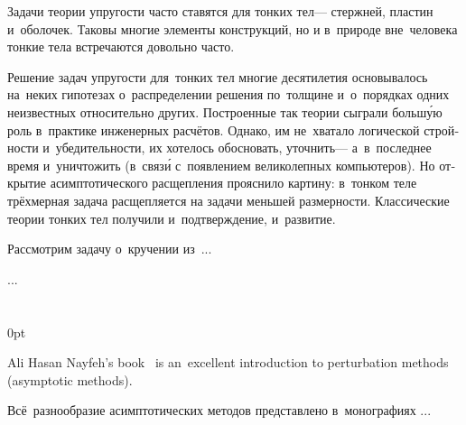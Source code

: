 \begin{otherlanguage}{russian}

Задачи теории упругости часто ставятся для тонких тел\:--- стержней, пластин и~оболочек.
Таковы многие элементы конструкций, но и в~природе вне~человека тонкие тела встречаются довольно часто.

Решение задач упругости для~тонких тел многие десятилетия основывалось на~неких гипотезах о~распределении решения по~толщине и~о~порядках одних неизвестных относительно других.
Построенные так теории сыграли больш\'{у}ю роль в~практике инженерных расчётов.
Однако, им не~хватало логической стройности и~убедительности, их хотелось обосновать, уточнить\:--- а~в~последнее время и~уничтожить (в~связ\'{и} с~появлением великолепных компьютеров).
Но открытие асимптотического расщепления прояснило картину: в~тонком теле трёхмерная задача расщепляется на задачи меньшей размерности.
Классические теории тонких тел получили и~подтверждение, и~развитие.

Рассмотрим задачу о~кручении из~...

...




\end{otherlanguage}

\section*{\small \wordforbibliography}

\begin{changemargin}{\parindent}{0pt}
\fontsize{10}{12}\selectfont

\begin{otherlanguage}{russian}

Ali Hasan Nayfeh’s book~\cite{nayfeh-perturbation} is an~excellent introduction to perturbation methods (asymptotic methods).

Всё~разнообразие асимптотических методов представлено в~монографиях ...

\end{otherlanguage}

\end{changemargin}
